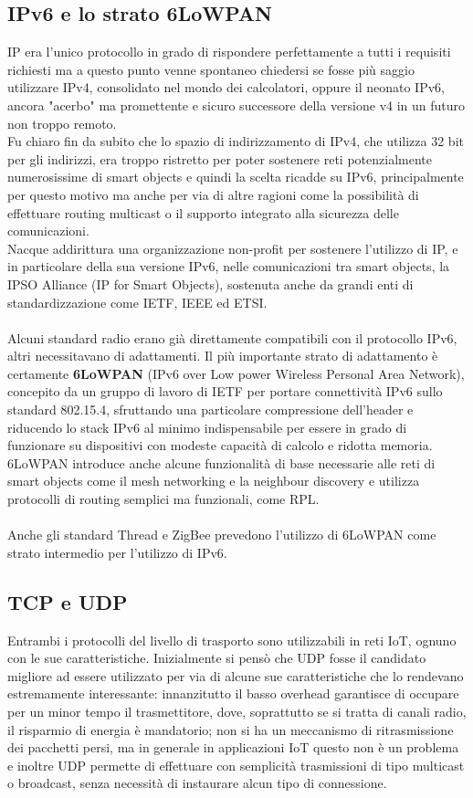 \subsection{IPv6 e lo strato 6LoWPAN}
IP era l'unico protocollo in grado di rispondere perfettamente a tutti i requisiti richiesti ma a questo punto venne spontaneo chiedersi se fosse più saggio utilizzare IPv4, consolidato nel mondo dei calcolatori, oppure il neonato IPv6, ancora "acerbo" ma promettente e sicuro successore della versione v4 in un futuro non troppo remoto.
\\Fu chiaro fin da subito che lo spazio di indirizzamento di IPv4, che utilizza 32 bit per gli indirizzi, era troppo ristretto per poter sostenere reti potenzialmente numerosissime di smart objects e quindi la scelta ricadde su IPv6, principalmente per questo motivo ma anche per via di altre ragioni come la possibilità di effettuare routing multicast o il supporto integrato alla sicurezza delle comunicazioni.
\\Nacque addirittura una organizzazione non-profit per sostenere l'utilizzo di IP, e in particolare della sua versione IPv6, nelle comunicazioni tra smart objects, la IPSO Alliance (IP for Smart Objects), sostenuta anche da grandi enti di standardizzazione come IETF, IEEE ed ETSI.
\\\\Alcuni standard radio erano già direttamente compatibili con il protocollo IPv6, altri necessitavano di adattamenti. Il più importante strato di adattamento è certamente \textbf{6LoWPAN} (IPv6 over Low power Wireless Personal Area Network), concepito da un gruppo di lavoro di IETF per portare connettività IPv6 sullo standard 802.15.4, sfruttando una particolare compressione dell'header e riducendo lo stack IPv6 al minimo indispensabile per essere in grado di funzionare su dispositivi con modeste capacità di calcolo e ridotta memoria.
\\6LoWPAN introduce anche alcune funzionalità di base necessarie alle reti di smart objects come il mesh networking e la neighbour discovery e utilizza protocolli di routing semplici ma funzionali, come RPL.
\\\\Anche gli standard Thread e ZigBee prevedono l'utilizzo di 6LoWPAN come strato intermedio per l'utilizzo di IPv6.

\subsection{TCP e UDP}
Entrambi i protocolli del livello di trasporto sono utilizzabili in reti IoT, ognuno con le sue caratteristiche. Inizialmente si pensò che UDP fosse il candidato migliore ad essere utilizzato per via di alcune sue caratteristiche che lo rendevano estremamente interessante: innanzitutto il basso overhead garantisce di occupare per un minor tempo il trasmettitore, dove, soprattutto se si tratta di canali radio, il risparmio di energia è mandatorio; non si ha un meccanismo di ritrasmissione dei pacchetti persi, ma in generale in applicazioni IoT questo non è un problema e inoltre UDP permette di effettuare con semplicità trasmissioni di tipo multicast o broadcast, senza necessità di instaurare alcun tipo di connessione.

